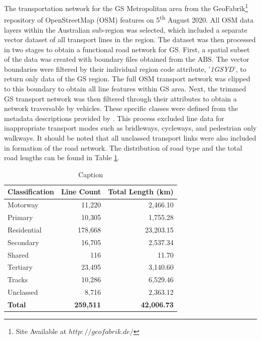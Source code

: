 The transportation network for the GS Metropolitan area from the GeoFabrik\footnote{Site Available at $http://geofabrik.de/$} repository of OpenStreetMap (OSM) features on 5\textsuperscript{th} August 2020. All OSM data layers within the Australian sub-region was selected, which included a separate vector dataset of all transport lines in the region. The dataset was then processed in two stages to obtain a functional road network for GS. First, a spatial subset of the data was created with boundary files obtained from the ABS. The vector boundaries were filtered by their individual region code attribute, '\textit{1GSYD}', to return only data of the GS region. The full OSM transport network was clipped to this boundary to obtain all line features within GS area. Next, the trimmed GS transport network was then filtered through their attributes to obtain a network traversable by vehicles. These specific classes were defined from the metadata descriptions provided by \cite{topf_2009}. This process excluded line data for inappropriate transport modes such as bridleways, cycleways, and pedestrian only walkways. It should be noted that all unclassed transport links were also included in formation of the road network. The distribution of road type and the total road lengths can be found in Table \ref{tab:road}.\\

\renewcommand{\baselinestretch}{0.8}
\begin{table}[!ht]
    \centering \small
    \begin{tabular}{lrr}
    \textbf{Classification} & \multicolumn{1}{r}{\textbf{Line Count}} & \multicolumn{1}{r}{\textbf{Total Length (km)}} \\
        \midrule
        Motorway & 11,220 & 2,466.10 \\
        Primary & 10,305 & 1,755.28 \\
        Residential & 178,668 & 23,203.15 \\
        Secondary & 16,705 & 2,537.34\\
        Shared & 116   & 11.70 \\
        Tertiary & 23,495 & 3,140.60 \\
        Tracks & 10,286 & 6,529.46 \\
        Unclassed & 8,716  & 2,363.12 \\
        \midrule
        \textbf{Total} & \textbf{259,511} & \textbf{42,006.73}\\
    \end{tabular}
    \caption{Caption}
    \label{tab:road}
\end{table}

